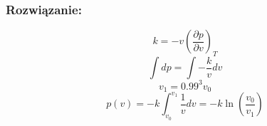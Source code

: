 \subsubsection*{Rozwiązanie:}
\begin{equation}
k = -v \left(\frac{\partial p}{\partial v}\right)_T 
\end{equation}
\begin{equation}
\int dp = \int -\frac{k}{v} dv 
\end{equation}
\begin{equation}
v_1 = 0.99^3 v_0
\end{equation}
\begin{equation}
p(v) = -k \int^{v_1}_{v_0} \frac{1}{v} dv = -k \ln\left( \frac{v_0}{v_1} \right)
\end{equation}
\hrulefill
